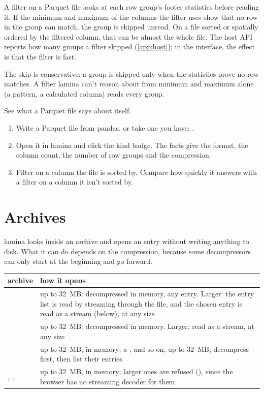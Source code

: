 A filter on a Parquet file looks at each row group's footer statistics before reading it. If the
minimum and maximum of the columns the filter uses show that no row in the group can match, the group is
skipped unread. On a file sorted or spatially ordered by the filtered column, that can be almost the
whole file. The host API reports how many groups a filter skipped (\cref{app:host}); in the interface,
the effect is that the filter is fast.

The skip is conservative: a group is skipped only when the statistics prove no row matches. A filter
lamina can't reason about from minimum and maximum alone (a  pattern, a calculated column)
reads every group.

\begin{tryit}
See what a Parquet file says about itself.
\begin{enumerate}
\item Write a Parquet file from pandas, or take one you have: .
\item Open it in lamina and click the kind badge. The facts give the format, the column count, the
number of row groups and the compression.
\item Filter on a column the file is sorted by. Compare how quickly it answers with a filter on a column
it isn't sorted by.
\end{enumerate}
\end{tryit}

\section{Archives}\label{sec:archives}

lamina looks inside an archive and opens an entry without writing anything to disk. What it can do
depends on the compression, because some decompressors can only start at the beginning and go forward.

\begin{center}\small
\begin{tabularx}{\linewidth}{@{}lL@{}}
\toprule
\sffamily\bfseries archive & \sffamily\bfseries how it opens \\
\midrule
{} & up to 32~MB: decompressed in memory, any entry. Larger: the entry list is read by streaming
through the file, and the chosen entry is read as a stream (below), at any size \\
 & up to 32~MB: decompressed in memory. Larger: read as a stream, at any size \\
 & up to 32~MB, in memory; a ,  and so on, up to 32~MB,
decompress first, then list their entries \\
, ,  & up to 32~MB, in memory; larger ones are refused (), since the browser has no streaming decoder for them \\
\bottomrule
\end{tabularx}
\end{center}

